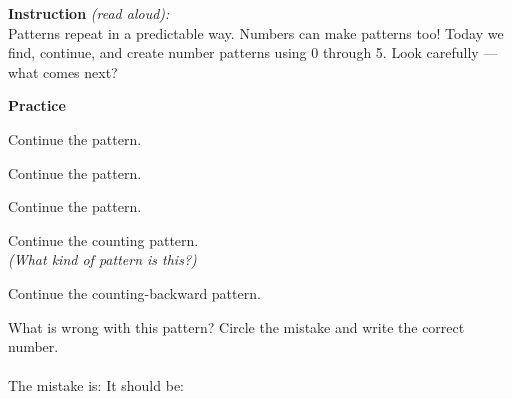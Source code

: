 \documentclass[12pt,letterpaper]{article}
\begin{document}

\begin{instructbox}
\noindent\textbf{\color{sd-blue}Instruction} \textit{(read aloud):}\\[4pt]
Patterns repeat in a predictable way.
Numbers can make patterns too!
Today we find, continue, and create number patterns using 0 through 5.
Look carefully — what comes next?
\end{instructbox}

\goldrule
\noindent\textbf{\color{sd-blue}Practice}
\vspace{6pt}

\prob Continue the pattern.\\[6pt]
\hspace{1cm}{\Large 1, 2, 1, 2, 1, \ansblank, \ansblank}

\vspace{10pt}
\prob Continue the pattern.\\[6pt]
\hspace{1cm}{\Large 0, 1, 2, 0, 1, 2, 0, \ansblank, \ansblank}

\vspace{10pt}
\prob Continue the pattern.\\[6pt]
\hspace{1cm}{\Large 1, 3, 5, 1, 3, \ansblank, \ansblank}

\vspace{10pt}
\prob Continue the counting pattern.\\[6pt]
\hspace{1cm}{\Large 0, 1, 2, 3, 4, \ansblank, \ansblank}
\textit{(What kind of pattern is this?)}

\vspace{10pt}
\prob Continue the counting-backward pattern.\\[6pt]
\hspace{1cm}{\Large 5, 4, 3, 2, \ansblank, \ansblank}

\vspace{10pt}
\prob What is wrong with this pattern? Circle the mistake and write the correct number.\\[6pt]
\\[6pt]
The mistake is: \ansblank \quad It should be: \ansblank
\end{document}
